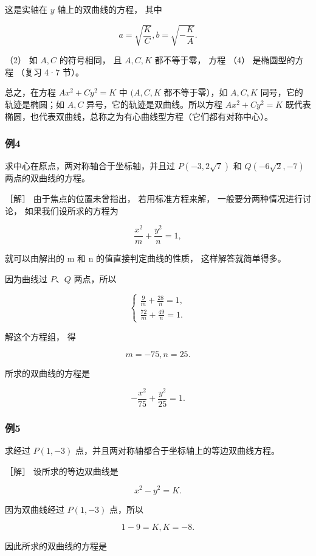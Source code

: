 这是实轴在 \(y\) 轴上的双曲线的方程， 其中

\[
a = \sqrt {\frac {K}{C}}, b = \sqrt {- \frac {K}{A}}.
\]

（2） 如 \(A, C\) 的符号相同， 且 \(A, C, K\) 都不等于零， 方程 （4）
是椭圆型的方程 （复习 4·7 节）。

总之，在方程 \(Ax^2 + Cy^2 = K\) 中 \((A, C, K\) 都不等于零），如
\(A, C, K\) 同号，它的轨迹是椭圆；如 \(A, C\)
异号，它的轨迹是双曲线。所以方程 \(Ax^2 + Cy^2 = K\)
既代表椭圆，也代表双曲线，总称之为有心曲线型方程（它们都有对称中心）。

\subsubsection{例4}\label{ux4f8b4-10}

求中心在原点，两对称轴合于坐标轴，并且过 \(P(-3, 2\sqrt{7})\) 和
\(Q(-6\sqrt{2}, -7)\) 两点的双曲线的方程。

［解］ 由于焦点的位置未曾指出， 若用标准方程来解，
一般要分两种情况进行讨论， 如果我们设所求的方程为

\[
\frac {x^{2}}{m} + \frac {y^{2}}{n} = 1,
\]

就可以由解出的 m 和 n 的值直接判定曲线的性质， 这样解答就简单得多。

因为曲线过 \(P\)、\(Q\) 两点，所以

\[
\left\{ \begin{array}{l} \frac {9}{m} + \frac {28}{n} = 1, \\ \frac {72}{m} + \frac {49}{n} = 1. \end{array} \right.
\]

解这个方程组， 得

\[
m = - 75, n = 25.
\]

所求的双曲线的方程是

\[
- \frac {x^{2}}{75} + \frac {y^{2}}{25} = 1.
\]

\subsubsection{例5}\label{ux4f8b5-6}

求经过 \(P(1, -3)\) 点，并且两对称轴都合于坐标轴上的等边双曲线方程。

［解］ 设所求的等边双曲线是

\[
x^{2} - y^{2} = K.
\]

因为双曲线经过 \(P(1, -3)\) 点，所以

\[
1 - 9 = K, K = - 8.
\]

因此所求的双曲线的方程是

